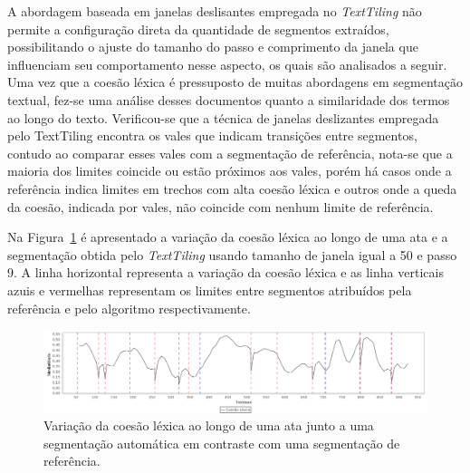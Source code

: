 

A abordagem baseada em janelas deslisantes empregada no \textit{TextTiling} não permite a configuração direta da quantidade de segmentos extraídos, possibilitando o ajuste do tamanho do passo e comprimento da janela que influenciam seu comportamento nesse aspecto, os quais são analisados a seguir.
Uma vez que a coesão léxica é pressuposto de muitas abordagens em segmentação textual, fez-se uma análise desses documentos quanto a similaridade dos termos ao longo do texto. Verificou-se que a técnica de janelas deslizantes empregada pelo TextTiling encontra os vales que indicam transições entre segmentos, contudo ao comparar esses vales com a segmentação de referência, nota-se que a maioria dos limites coincide ou estão próximos aos vales, porém há casos onde a referência indica limites em trechos com alta coesão léxica e outros onde a queda da coesão, indicada por vales, não coincide com nenhum limite de referência.  

Na Figura~\ref{fig:coesaolexicaTT} é apresentado a variação da coesão léxica ao longo de uma ata e a segmentação obtida pelo \textit{TextTiling} usando tamanho de janela igual a 50 e passo 9. A linha horizontal representa a variação da coesão léxica e as linha verticais azuis e vermelhas representam os limites entre segmentos atribuídos pela referência e pelo algoritmo respectivamente. 


  \begin{figure}[!h]
	  \centering
	  \includegraphics[width=\textwidth]{conteudo/capitulos/figs/coesaolexicaTT-50-9.png}
	  \caption{Variação da coesão léxica ao longo de uma ata junto a uma segmentação automática em contraste com uma segmentação de referência.}
	  \label{fig:coesaolexicaTT}
  \end{figure}










